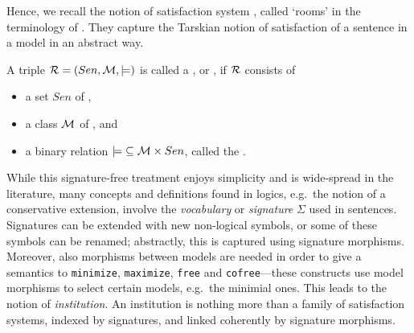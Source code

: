 \documentclass[10pt,fleqn,%
\ifpretendfinal
final%
\else
draft%
\fi,
]{scrreprt}
\newcommand*{\syntax}[1]{\texttt{#1}}
\begin{document}
Hence, we recall the notion of satisfaction system
\cite{carnielli2008analysis}, called `rooms' in the terminology of
\cite{CharPar}. They capture the Tarskian notion of satisfaction of a
sentence in a model in an abstract way. 

\begin{definition}\label{def:room}
A triple ${\cal R}=(Sen,{{\cal M},\models)}$  is called a  , or , if ${\cal R}$  consists of
\begin{itemize}
\item a set $Sen$ of ,
\item a class
${\cal M}$ of , and
\item a binary relation
${\models}\subseteq {\cal M} \times Sen$, called the .
\end{itemize}
\end{definition}


While this signature-free treatment enjoys simplicity and is wide-spread in the literature, many 
concepts and definitions found in logics, e.g.\ the notion of a conservative extension, involve the
\emph{vocabulary} or \emph{signature} $\Sigma$ \label{vocabulary} used in sentences.  Signatures 
can be extended with new non-logical symbols, or some of these symbols can be renamed; abstractly, 
this is captured using signature morphisms. Moreover, also morphisms
between models are needed in order to give a semantics to \syntax{minimize},
\syntax{maximize}, \syntax{free} and \syntax{cofree}---these constructs
use model morphisms to select certain models, e.g.\ the minimial ones.
This leads to the notion of \emph{institution}. An institution
is nothing more than a family of satisfaction systems, indexed by
signatures, and linked coherently by signature morphisms.
\end{document}
